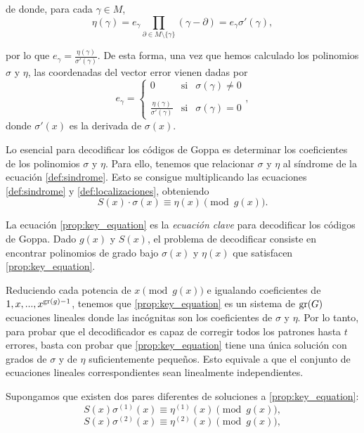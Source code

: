 de donde, para cada $\gamma \in M$,
\[
    \eta (\gamma) = e_\gamma \prod_{\partial \in M \setminus \{ \gamma \} } (\gamma - \partial) = e_\gamma \sigma'(\gamma),
\]

por lo que $e_\gamma = \frac{\eta(\gamma)}{\sigma'(\gamma)}$. De esta forma, una vez que hemos calculado los polinomios $\sigma$ y $\eta$, las coordenadas del vector error vienen dadas por 
\[
    e_\gamma = \left\{ \begin{array}{lcc}
    0 &   \text{si}  & \sigma(\gamma) \neq 0 \\
    \\ \frac{\eta(\gamma)}{\sigma'(\gamma)} &  \text{si} & \sigma(\gamma) = 0
    \end{array}
    \right. ,
\]
donde $\sigma'(x)$ es la derivada de $\sigma(x)$.

Lo esencial para decodificar los códigos de Goppa es determinar los coeficientes de los polinomios $\sigma$ y $\eta$. Para ello, tenemos que relacionar $\sigma$ y $\eta$ al síndrome de la ecuación \eqref{def:sindrome}. Esto se consigue multiplicando las ecuaciones \eqref{def:sindrome} y \eqref{def:localizaciones}, obteniendo
\begin{equation}
    \label{prop:key_equation}
    S(x) \cdot \sigma(x) \equiv \eta(x) \pmod{g(x)}.
\end{equation}

La ecuación \eqref{prop:key_equation} es la \emph{ecuación clave} para decodificar los códigos de Goppa. Dado $g(x)$ y $S(x)$, el problema de decodificar consiste en encontrar polinomios de grado bajo $\sigma(x)$ y $\eta(x)$ que satisfacen \eqref{prop:key_equation}.

Reduciendo cada potencia de $x \pmod{g(x)}$ e igualando coeficientes de $1, x, ..., x^{\operatorname{gr}(g) - 1}$, tenemos que \eqref{prop:key_equation} es un sistema de $\operatorname{gr}(G)$ ecuaciones lineales donde las incógnitas son los coeficientes de $\sigma$ y $\eta$. Por lo tanto, para probar que el decodificador es capaz de corregir todos los patrones hasta $t$ errores, basta con probar que \eqref{prop:key_equation} tiene una única solución con grados de $\sigma$ y de $\eta$ suficientemente pequeños. Esto equivale a que el conjunto de ecuaciones lineales correspondientes sean linealmente independientes.

Supongamos que existen dos pares diferentes de soluciones a \eqref{prop:key_equation}:
\begin{equation}
    \label{prop:key_equation_1}
    S(x) \sigma^{(1)}(x) \equiv \eta^{(1)}(x) \pmod{g(x)},
\end{equation}
\begin{equation}
    \label{prop:key_equation_2}
    S(x) \sigma^{(2)}(x) \equiv \eta^{(2)}(x) \pmod{g(x)},
\end{equation}

